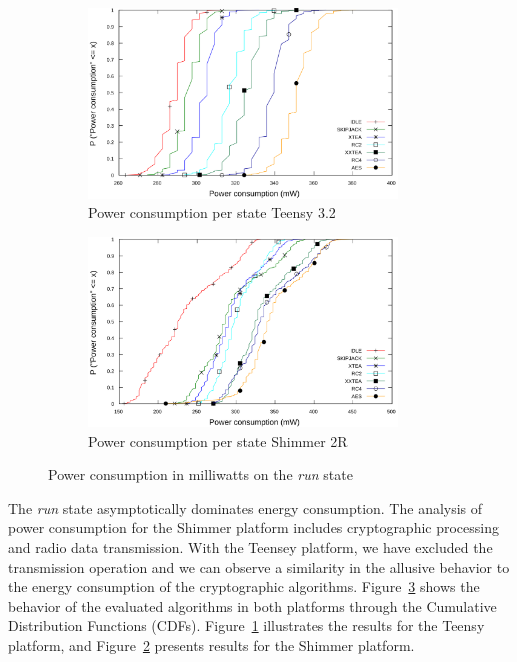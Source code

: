 \documentclass[journal]{IEEEtran}
\begin{document}
\begin{figure}[!t]
 \vspace{-0.5cm}
\centering
 \begin{subfigure}[b]{0.35\textwidth}
  \includegraphics[width=0.9\textwidth]{Figures/cdf_Teensy.png}
  \caption{ Power consumption per state Teensy 3.2}
  \label{fig:cdf_Teensy}
 \end{subfigure}
 \begin{subfigure}[b]{0.35\textwidth}
  \includegraphics[width=0.9\textwidth]{Figures/cdf_zig.png}
  \caption{ Power consumption per state Shimmer 2R}
  \label{fig:cdf_zig}
 \end{subfigure}
 \vspace{-0.2cm}
 \caption{Power consumption in milliwatts on the {\em run} state}
 \label{fig:cdf}
 \vspace{-0.45cm}
\end{figure}

 The {\em run} state asymptotically dominates energy consumption. The analysis of power consumption for the Shimmer platform includes cryptographic processing and radio data transmission. With the Teensey platform, we have excluded the transmission operation and we can observe a similarity in the allusive behavior to the energy consumption of the cryptographic algorithms. Figure~\ref{fig:cdf} shows the behavior of the evaluated algorithms in both platforms through the Cumulative Distribution Functions (CDFs). Figure~\ref{fig:cdf_Teensy} illustrates the results for the Teensy platform, and Figure~\ref{fig:cdf_zig} presents results for the Shimmer platform.
\end{document}
